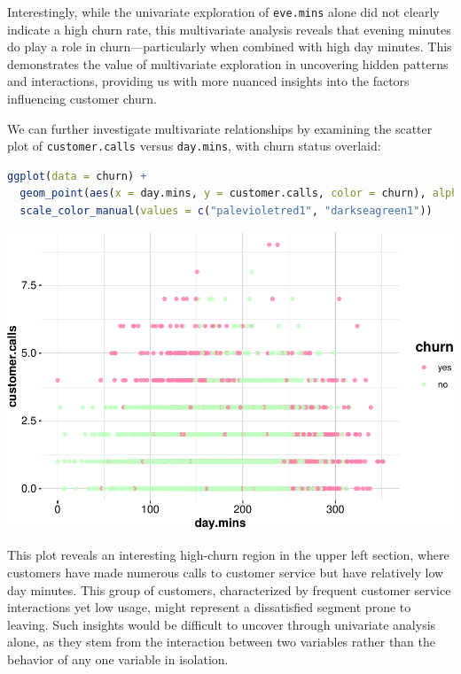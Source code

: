 \documentclass[
]{book}
\newcommand{\passthrough}[1]{#1}
\theoremstyle{definition}
\theoremstyle{definition}
\theoremstyle{definition}
\theoremstyle{definition}
\theoremstyle{remark}
\begin{document}
Interestingly, while the univariate exploration of \passthrough{\lstinline!eve.mins!} alone did not clearly indicate a high churn rate, this multivariate analysis reveals that evening minutes do play a role in churn---particularly when combined with high day minutes. This demonstrates the value of multivariate exploration in uncovering hidden patterns and interactions, providing us with more nuanced insights into the factors influencing customer churn.

We can further investigate multivariate relationships by examining the scatter plot of \passthrough{\lstinline!customer.calls!} versus \passthrough{\lstinline!day.mins!}, with churn status overlaid:

\begin{lstlisting}[language=R]
ggplot(data = churn) +
  geom_point(aes(x = day.mins, y = customer.calls, color = churn), alpha = 0.8) +
  scale_color_manual(values = c("palevioletred1", "darkseagreen1"))
\end{lstlisting}

\begin{center}\includegraphics{EDA_files/figure-latex/unnamed-chunk-17-1} \end{center}

This plot reveals an interesting high-churn region in the upper left section, where customers have made numerous calls to customer service but have relatively low day minutes. This group of customers, characterized by frequent customer service interactions yet low usage, might represent a dissatisfied segment prone to leaving. Such insights would be difficult to uncover through univariate analysis alone, as they stem from the interaction between two variables rather than the behavior of any one variable in isolation.
\end{document}
